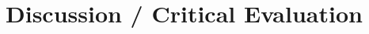 \documentclass[12pt]{article}
\begin{document}




\section{Discussion / Critical Evaluation}




\noindent




\end{document}
